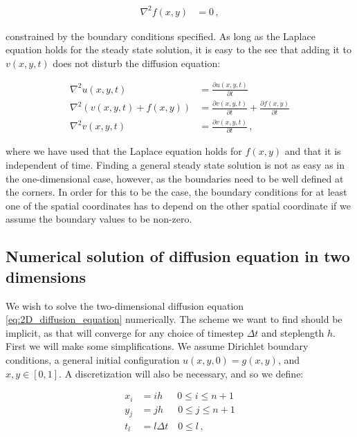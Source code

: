 \documentclass[reprint,english,notitlepage]{revtex4-1}  %
\begin{document}
\begin{align*}
\nabla^2 f(x,y) &= 0 \, ,
\end{align*}

constrained by the boundary conditions specified. As long as the Laplace equation holds for the steady state solution, it is easy to the see that adding it to $v(x,y,t)$ does not disturb the diffusion equation:

\begin{align*}
\nabla^2 u(x,y,t) &= \frac{\partial u(x,y,t)}{\partial t} \\
\nabla^2 (v(x,y,t) + f(x,y) ) &= \frac{\partial v(x,y,t)}{\partial t} + \frac{\partial f(x,y)}{\partial t} \\
\nabla^2 v(x,y,t) &= \frac{\partial v(x,y,t)}{\partial t} \, ,
\end{align*}

where we have used that the Laplace equation holds for $f(x,y)$ and that it is independent of time. Finding a general steady state solution is not as easy as in the one-dimensional case, however, as the boundaries need to be well defined at the corners. In order for this to be the case, the boundary conditions for at least one of the spatial coordinates has to depend on the other spatial coordinate if we assume the boundary values to be non-zero. 





\subsection{Numerical solution of diffusion equation in two dimensions} \label{sec:formalism_2D_diff_eq_numerical}

We wish to solve the two-dimensional diffusion equation \eqref{eq:2D_diffusion_equation} numerically. The scheme we want to find should be implicit, as that will converge for any choice of timestep $\Delta t$ and steplength $h$. First we will make some simplifications. We assume Dirichlet boundary conditions, a general initial configuration $u(x,y,0) = g(x,y)$, and $x,y\in[0,1]$. A discretization will also be necessary, and so we define:

\begin{align*}
x_i &= i h \,\,\,\quad 0 \leq i \leq n+1 \\
y_j &= j h \,\,\,\quad 0 \leq j \leq n+1 \\
t_l &= l \Delta t \quad 0 \leq l \, ,
\end{align*}
\end{document}
